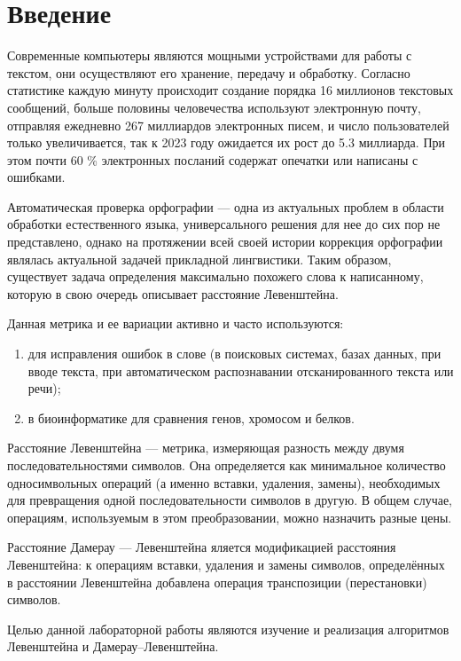 \chapter*{Введение}

Современные компьютеры являются мощными устройствами для
работы с текстом, они осуществляют его хранение, передачу и
обработку. Согласно статистике каждую минуту происходит создание
порядка 16 миллионов текстовых сообщений, больше половины
человечества используют электронную почту, отправляя ежедневно 267 миллиардов электронных писем, и число пользователей только
увеличивается, так к 2023 году ожидается их рост до 5.3 миллиарда. При этом почти 60 \% электронных посланий содержат опечатки или написаны с ошибками.

Автоматическая проверка орфографии — одна из актуальных
проблем в области обработки естественного языка, универсального
решения для нее до сих пор не представлено, однако на протяжении
всей своей истории коррекция орфографии являлась актуальной задачей прикладной лингвистики. Таким образом, существует задача определения максимально похожего слова к написанному, которую в свою очередь описывает расстояние Левенштейна.

Данная метрика и ее вариации активно и часто используются: 
\begin{enumerate}[label={\arabic*)}]
	\item для исправления ошибок в слове (в поисковых системах, базах данных, при вводе текста, при автоматическом распознавании отсканированного текста или речи);
	\item в биоинформатике для сравнения генов, хромосом и белков.
\end{enumerate}

Расстояние Левенштейна \cite{Levenshtein} — метрика, измеряющая разность между двумя последовательностями символов. Она определяется как минимальное количество односимвольных операций (а именно вставки, удаления, замены), необходимых для превращения одной последовательности символов в другую. В общем случае, операциям, используемым в этом преобразовании, можно назначить разные цены.

Расстояние Дамерау — Левенштейна яляется модификацией расстояния Левенштейна: к операциям вставки, удаления и замены символов, определённых в расстоянии Левенштейна добавлена операция транспозиции (перестановки) символов.



Целью данной лабораторной работы являются изучение и реализация алгоритмов Левенштейна и Дамерау--Левенштейна.

